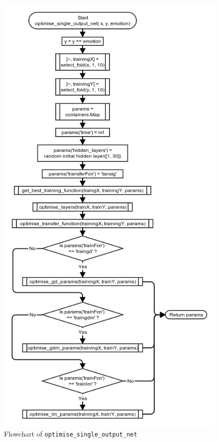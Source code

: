 \documentclass[10pt,a4paper]{article}
\begin{document}
\begin{figure}[!ht]
	\centering
	\includegraphics[scale=0.7]{images/flow_chart/optimise_single_output_net.png}
	\caption{Flowchart of \tt{optimise\_single\_output\_net}}
	\label{fig:optimise_single_output_net}
\end{figure}
\end{document}
